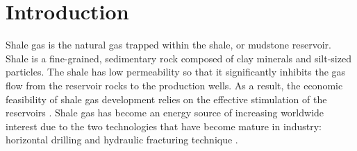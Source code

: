 \section{Introduction}





Shale gas is the natural gas trapped within the shale, or mudstone reservoir.  %
Shale is a fine-grained, sedimentary rock composed of clay minerals and silt-sized particles. %
The shale has low permeability so that it significantly inhibits the gas flow from the reservoir rocks to the production wells. As a result, the economic feasibility of shale gas development relies on the effective stimulation of the reservoirs \cite{hattori2017numerical}.
Shale gas has become an energy source of increasing worldwide interest due to the two technologies that have become mature in industry: horizontal drilling and hydraulic fracturing technique \cite{middleton2014co2}.

